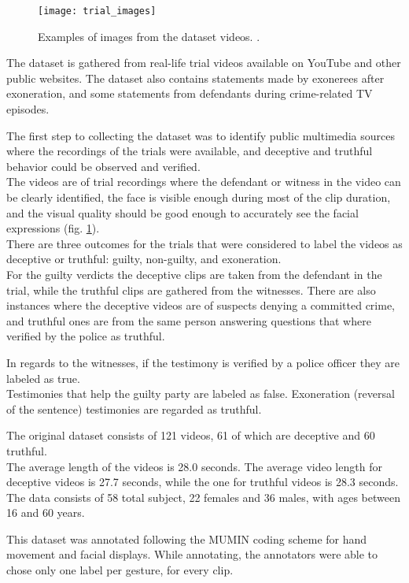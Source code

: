 \begin{figure}[H]
	\centering
	\texttt{[image: trial\_images]}
	\caption{Examples of images from the dataset videos. \cite{Perez-Rosas:2015:DDU:2818346.2820758}.}
	\label{fig:trial_images}
\end{figure}


The dataset is gathered from real-life trial videos available on YouTube and other public websites. The dataset also contains statements made by exonerees after exoneration, and some statements from defendants during crime-related TV episodes.

The first step to collecting the dataset was to identify public multimedia sources where the recordings of the trials were available, and deceptive and truthful behavior could be observed and verified.\\
The videos are of trial recordings where the defendant or witness in the video can be clearly identified, the face is visible enough during most of the clip duration, and the visual quality should be good enough to accurately see the facial expressions (fig. \ref{fig:trial_images}).\\
There are three outcomes for the trials that were considered to label the videos as deceptive or truthful: guilty, non-guilty, and exoneration. \\
For the guilty verdicts the deceptive clips are taken from the defendant in the trial, while the truthful clips are gathered from the witnesses. There are also instances where the deceptive videos are of suspects denying a committed crime, and truthful ones are from the same person answering questions that where verified by the police as truthful.

In regards to the witnesses, if the testimony is verified by a police officer they are labeled as true. \\ 
Testimonies that help the guilty party are labeled as false. Exoneration (reversal of the sentence) testimonies are regarded as truthful.

The original dataset consists of 121 videos, 61 of which are deceptive and 60 truthful. \\
The average length of the videos is 28.0 seconds. The average video length for deceptive videos is 27.7 seconds, while the one for truthful videos is 28.3 seconds. \\
The data consists of 58 total subject, 22 females and 36 males, with ages between 16 and 60 years.

This dataset was annotated following the MUMIN coding scheme for hand movement and facial displays. While annotating, the annotators were able to chose only one label per gesture, for every clip.

